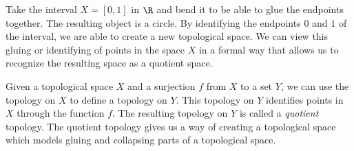 \label{sec:quotients}


\vspace*{-17 pt}

\vspace*{13 pt}


Take the interval $X = [0,1]$ in $\R$ and bend it to be able to glue the endpoints together. The resulting object is a circle. By identifying the endpoints $0$ and $1$ of the interval, we are able to create a new topological space. We can view this gluing or identifying of points in the space $X$ in a formal way that allows us to recognize the resulting space as a quotient space. 


Given a topological space $X$ and a surjection $f$ from $X$ to a set $Y$, we can use the topology on $X$ to define a topology on $Y$. This topology on $Y$ identifies points in $X$ through the function $f$. The resulting topology on $Y$ is called a \emph{quotient} topology. The quotient topology gives us a way of creating a topological space which models gluing and collapsing parts of a topological space.


